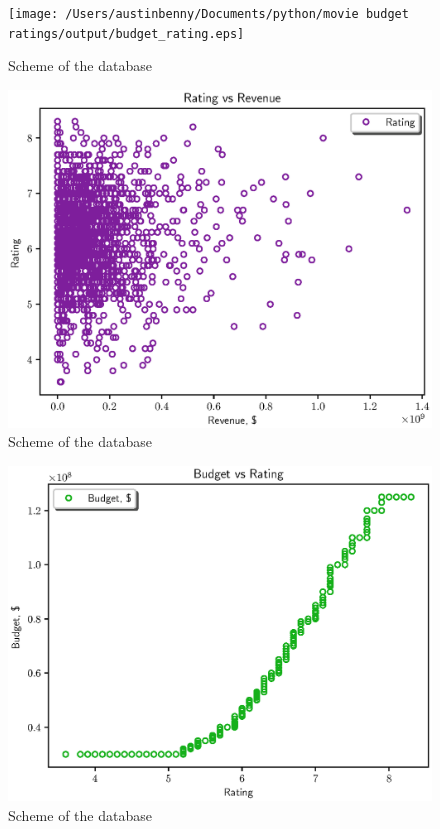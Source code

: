 \documentclass{article}
\begin{document}
\begin{figure}[htp]
    \texttt{[image: /Users/austinbenny/Documents/python/movie budget ratings/output/budget\_rating.eps]}
    \caption{Scheme of the database}
    \label{fig:db}
 \end{figure}

 \begin{figure}[htp]
    \includegraphics{rating_revenue.eps}
    \caption{Scheme of the database}
    \label{fig:db}
 \end{figure}

 \begin{figure}[htp]
   \includegraphics{budget_rating.eps}
   \caption{Scheme of the database}
   \label{fig:db}
\end{figure}
\end{document}
